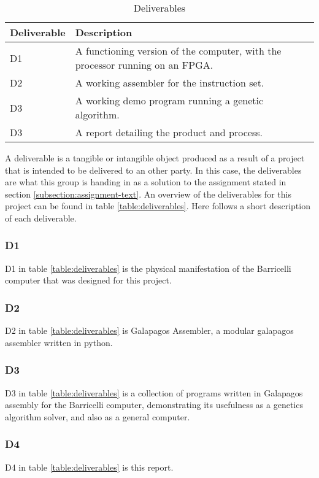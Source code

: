  \begin{table}[H]
 \begin{center}
 \begin{tabular}{| l | p{9cm} |}
 \hline
 Deliverable & Description \\
 \hline
 D1 & A functioning version of the computer, with the processor running on an FPGA.\\
 D2 & A working assembler for the instruction set.\\
 D3 & A working demo program running a genetic algorithm.\\
 D3 & A report detailing the product and process.\\
 \hline
 \end{tabular}
 \caption{Deliverables}
 \label{table:deliverables}
 \end{center}
 \end{table}

A deliverable is a tangible or intangible object produced as a result of a project that is intended to be delivered to an other party.
In this case, the deliverables are what this group is handing in as a solution to the assignment stated in section \vref{subsection:assignment-text}.
An overview of the deliverables for this project can be found in table \vref{table:deliverables}.
Here follows a short description of each deliverable.

\subsubsection{D1}

D1 in table \vref{table:deliverables} is the physical manifestation of the Barricelli computer that was designed for this project.

\subsubsection{D2}

D2 in table \vref{table:deliverables} is Galapagos Assembler, a modular \gls{galapagos} assembler written in python.

\subsubsection{D3}

D3 in table \vref{table:deliverables} is a collection of programs written in Galapagos assembly for the Barricelli computer, demonstrating its usefulness as a genetics algorithm solver, and also as a general computer.

\subsubsection{D4}

D4 in table \vref{table:deliverables} is this report.

